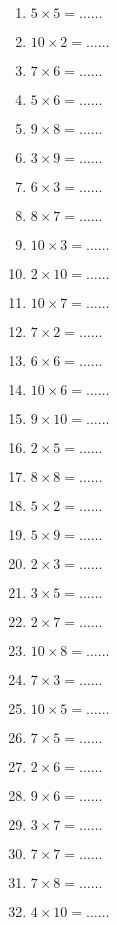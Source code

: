 \documentclass[11pt]{article}
\begin{document}
\begin{exercice}[1]
\begin{multicols}{5}
\begin{enumerate}[label=\arabic*)]
\item  $ 5\times 5 =\ldots\ldots$ 
\item  $ 10\times 2 =\ldots\ldots$ 
\item  $ 7\times 6 =\ldots\ldots$ 
\item  $ 5\times 6 =\ldots\ldots$ 
\item  $ 9\times 8 =\ldots\ldots$ 
\item  $ 3\times 9 =\ldots\ldots$ 
\item  $ 6\times 3 =\ldots\ldots$ 
\item  $ 8\times 7 =\ldots\ldots$ 
\item  $ 10\times 3 =\ldots\ldots$ 
\item  $ 2\times 10 =\ldots\ldots$ 
\item  $ 10\times 7 =\ldots\ldots$ 
\item  $ 7\times 2 =\ldots\ldots$ 
\item  $ 6\times 6 =\ldots\ldots$ 
\item  $ 10\times 6 =\ldots\ldots$ 
\item  $ 9\times 10 =\ldots\ldots$ 
\item  $ 2\times 5 =\ldots\ldots$ 
\item  $ 8\times 8 =\ldots\ldots$ 
\item  $ 5\times 2 =\ldots\ldots$ 
\item  $ 5\times 9 =\ldots\ldots$ 
\item  $ 2\times 3 =\ldots\ldots$ 
\item  $ 3\times 5 =\ldots\ldots$ 
\item  $ 2\times 7 =\ldots\ldots$ 
\item  $ 10\times 8 =\ldots\ldots$ 
\item  $ 7\times 3 =\ldots\ldots$ 
\item  $ 10\times 5 =\ldots\ldots$ 
\item  $ 7\times 5 =\ldots\ldots$ 
\item  $ 2\times 6 =\ldots\ldots$ 
\item  $ 9\times 6 =\ldots\ldots$ 
\item  $ 3\times 7 =\ldots\ldots$ 
\item  $ 7\times 7 =\ldots\ldots$ 
\item  $ 7\times 8 =\ldots\ldots$ 
\item  $ 4\times 10 =\ldots\ldots$ 

\end{enumerate}
\end{multicols}
\end{exercice}
\end{document}
